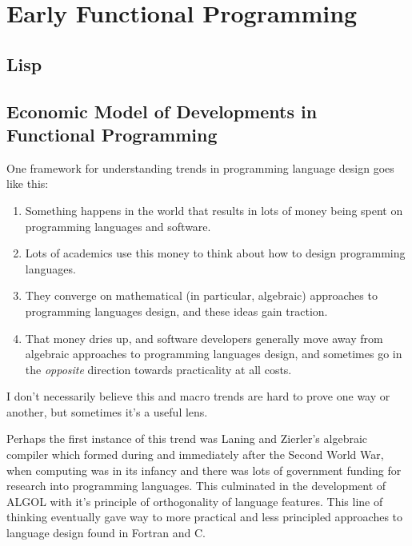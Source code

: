 \section{Early Functional Programming}

\subsection{Lisp}


\subsection{Economic Model of Developments in Functional Programming}
\iffalse
	One framework for understanding trends in programming language design
	goes like this:

	\begin{enumerate}
		\item Something happens in the world that results in lots of money being spent on
		      programming languages and software.
		\item Lots of academics use this money to think about how to design programming languages.
		\item They converge on mathematical (in particular, algebraic)
		      approaches to programming languages design,
		      and these ideas gain traction.
		\item That money dries up, and software developers generally move
		      away from algebraic approaches to programming languages design,
		      and sometimes go in the \textit{opposite} direction towards
		      practicality at all costs.
	\end{enumerate}

	I don't necessarily believe this and macro trends are hard to prove one
	way or another, but sometimes it's a useful lens.

	Perhaps the first instance of this trend was Laning and Zierler's algebraic compiler
	which formed during and immediately after the Second World War, when computing was
	in its infancy and there was lots of government funding for research into programming languages.
	This culminated in the development of ALGOL with it's principle of orthogonality of language
	features.
	This line of thinking eventually gave way to more practical and less principled approaches to
	language design found in Fortran and C.

